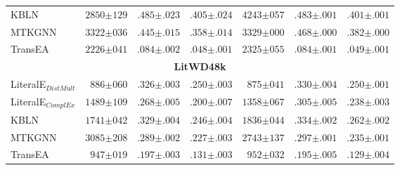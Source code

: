 \begin{table}[]
\begin{center}
\begin{tabular}{l|rll|rll}
KBLN& $2850{\scriptstyle \pm 129}$ & $.485{\scriptstyle \pm .023}$ & $.405{\scriptstyle \pm .024}$ & $4243{\scriptstyle \pm 057}$ & $.483{\scriptstyle \pm .001}$ & $.401{\scriptstyle \pm .001}$  \\ 
MTKGNN& $3322{\scriptstyle \pm 036}$ & $.445{\scriptstyle \pm .015}$ & $.358{\scriptstyle \pm .014}$ & $3329{\scriptstyle \pm 000}$ & $.468{\scriptstyle \pm .000}$ & $.382{\scriptstyle \pm .000}$  \\ 
TransEA& $2226{\scriptstyle \pm 041}$ & $.084{\scriptstyle \pm .002}$ & $.048{\scriptstyle \pm .001}$ & $2325{\scriptstyle \pm 055}$ & $.084{\scriptstyle \pm .001}$ & $.049{\scriptstyle \pm .001}$  \\ 
\hline \multicolumn{7}{c}{\textbf{LitWD48k}} \\ \hline 
LiteralE$_{DistMult}$& $886{\scriptstyle \pm 060}$ & $.326{\scriptstyle \pm .003}$ & $.250{\scriptstyle \pm .003}$ & $875{\scriptstyle \pm 041}$ & $.330{\scriptstyle \pm .004}$ & $.250{\scriptstyle \pm .001}$  \\ 
LiteralE$_{ComplEx}$& $1489{\scriptstyle \pm 109}$ & $.268{\scriptstyle \pm .005}$ & $.200{\scriptstyle \pm .007}$ & $1358{\scriptstyle \pm 067}$ & $.305{\scriptstyle \pm .005}$ & $.238{\scriptstyle \pm .003}$  \\ 
KBLN& $1741{\scriptstyle \pm 042}$ & $.329{\scriptstyle \pm .004}$ & $.246{\scriptstyle \pm .004}$ & $1836{\scriptstyle \pm 044}$ & $.334{\scriptstyle \pm .002}$ & $.262{\scriptstyle \pm .002}$  \\ 
MTKGNN& $3085{\scriptstyle \pm 208}$ & $.289{\scriptstyle \pm .002}$ & $.227{\scriptstyle \pm .003}$ & $2743{\scriptstyle \pm 137}$ & $.297{\scriptstyle \pm .001}$ & $.235{\scriptstyle \pm .001}$  \\ 
TransEA& $947{\scriptstyle \pm 019}$ & $.197{\scriptstyle \pm .003}$ & $.131{\scriptstyle \pm .003}$ & $952{\scriptstyle \pm 032}$ & $.195{\scriptstyle \pm .005}$ & $.129{\scriptstyle \pm .004}$  \\ 

\hline
\end{tabular}
\end{center}
\end{table}
